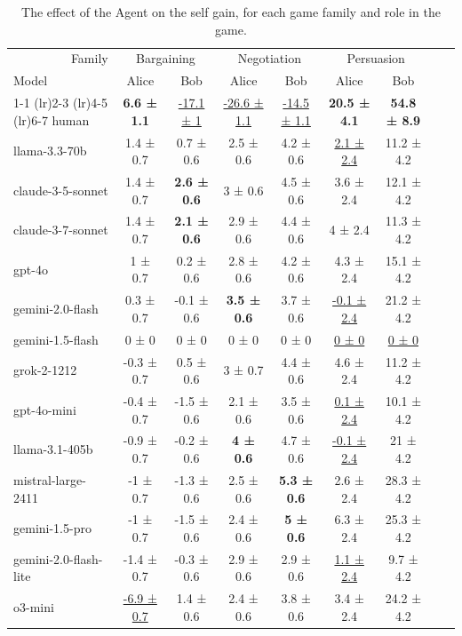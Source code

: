 
\begin{table}[ht]
\centering
\caption{The effect of the Agent on the self gain, for each game family and role in the game.}
{\renewcommand{\arraystretch}{0.95}
\begin{tabular}{lcccccccc}
\toprule
\multicolumn{1}{r}{Family} & \multicolumn{2}{c}{Bargaining} & \multicolumn{2}{c}{Negotiation} & \multicolumn{2}{c}{Persuasion} \\
Model & Alice & Bob & Alice & Bob & Alice & Bob \\
\cmidrule(lr){1-1} \cmidrule(lr){2-3} \cmidrule(lr){4-5} \cmidrule(lr){6-7}
human & \textbf{6.6 ± 1.1} & \underline{-17.1 ± 1} & \underline{-26.6 ± 1.1} & \underline{-14.5 ± 1.1} & \textbf{20.5 ± 4.1} & \textbf{54.8 ± 8.9} \\
llama-3.3-70b & 1.4 ± 0.7 & 0.7 ± 0.6 & 2.5 ± 0.6 & 4.2 ± 0.6 & \underline{2.1 ± 2.4} & 11.2 ± 4.2 \\
claude-3-5-sonnet & 1.4 ± 0.7 & \textbf{2.6 ± 0.6} & 3 ± 0.6 & 4.5 ± 0.6 & 3.6 ± 2.4 & 12.1 ± 4.2 \\
claude-3-7-sonnet & 1.4 ± 0.7 & \textbf{2.1 ± 0.6} & 2.9 ± 0.6 & 4.4 ± 0.6 & 4 ± 2.4 & 11.3 ± 4.2 \\
gpt-4o & 1 ± 0.7 & 0.2 ± 0.6 & 2.8 ± 0.6 & 4.2 ± 0.6 & 4.3 ± 2.4 & 15.1 ± 4.2 \\
gemini-2.0-flash & 0.3 ± 0.7 & -0.1 ± 0.6 & \textbf{3.5 ± 0.6} & 3.7 ± 0.6 & \underline{-0.1 ± 2.4} & 21.2 ± 4.2 \\
gemini-1.5-flash & 0 ± 0 & 0 ± 0 & 0 ± 0 & 0 ± 0 & \underline{0 ± 0} & \underline{0 ± 0} \\
grok-2-1212 & -0.3 ± 0.7 & 0.5 ± 0.6 & 3 ± 0.7 & 4.4 ± 0.6 & 4.6 ± 2.4 & 11.2 ± 4.2 \\
gpt-4o-mini & -0.4 ± 0.7 & -1.5 ± 0.6 & 2.1 ± 0.6 & 3.5 ± 0.6 & \underline{0.1 ± 2.4} & 10.1 ± 4.2 \\
llama-3.1-405b & -0.9 ± 0.7 & -0.2 ± 0.6 & \textbf{4 ± 0.6} & 4.7 ± 0.6 & \underline{-0.1 ± 2.4} & 21 ± 4.2 \\
mistral-large-2411 & -1 ± 0.7 & -1.3 ± 0.6 & 2.5 ± 0.6 & \textbf{5.3 ± 0.6} & 2.6 ± 2.4 & 28.3 ± 4.2 \\
gemini-1.5-pro & -1 ± 0.7 & -1.5 ± 0.6 & 2.4 ± 0.6 & \textbf{5 ± 0.6} & 6.3 ± 2.4 & 25.3 ± 4.2 \\
gemini-2.0-flash-lite & -1.4 ± 0.7 & -0.3 ± 0.6 & 2.9 ± 0.6 & 2.9 ± 0.6 & \underline{1.1 ± 2.4} & 9.7 ± 4.2 \\
o3-mini & \underline{-6.9 ± 0.7} & 1.4 ± 0.6 & 2.4 ± 0.6 & 3.8 ± 0.6 & 3.4 ± 2.4 & 24.2 ± 4.2 \\
\bottomrule
\end{tabular}
}
\label{self_gain}
\end{table}
